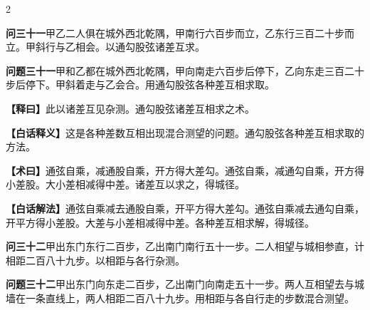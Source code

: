 \documentclass[11pt,a4paper]{article}
\newcommand{\WenQuestion}[1]{\textbf{\textcolor{classicalcolor}{#1}}}
\newcommand{\BaiQuestion}[1]{\textbf{\textcolor{moderncolor}{#1}}}
\newcommand{\WenExplain}{\textcolor{classicalcolor}{\textbf{【释曰】}}}
\newcommand{\BaiExplain}{\textcolor{moderncolor}{\textbf{【白话释义】}}}
\newcommand{\WenMethod}{\textcolor{classicalcolor}{\textbf{【术曰】}}}
\newcommand{\BaiMethod}{\textcolor{moderncolor}{\textbf{【白话解法】}}}
\begin{document}
\begin{paracol}{2}
\vspace{0.8em}

\switchcolumn*
\begin{tcolorbox}[colback=red!3,colframe=red!30!black,boxrule=0.3pt]
\WenQuestion{问三十一}\quad 甲乙二人俱在城外西北乾隅，甲南行六百步而立，乙东行三百二十步而立。甲斜行与乙相会。以通勾股弦诸差互求。
\end{tcolorbox}
\switchcolumn
\begin{tcolorbox}[colback=blue!3,colframe=blue!30!black,boxrule=0.3pt]
\BaiQuestion{问题三十一}\quad 甲和乙都在城外西北乾隅，甲向南走六百步后停下，乙向东走三百二十步后停下。甲斜着走与乙会合。用通勾股弦各种差互相求取。
\end{tcolorbox}

\switchcolumn*
\begin{tcolorbox}[colback=red!5,colframe=red!30!black,boxrule=0.3pt]
\WenExplain\quad 此以诸差互见杂测。通勾股弦诸差互相求之术。
\end{tcolorbox}
\switchcolumn
\begin{tcolorbox}[colback=blue!5,colframe=blue!30!black,boxrule=0.3pt]
\BaiExplain\quad 这是各种差数互相出现混合测望的问题。通勾股弦各种差互相求取的方法。
\end{tcolorbox}

\switchcolumn*
\begin{tcolorbox}[colback=red!5,colframe=red!40!black,boxrule=0.3pt]
\WenMethod\quad 通弦自乘，减通股自乘，开方得大差勾。通弦自乘，减通勾自乘，开方得小差股。大小差相减得中差。诸差互以求之，得城径。
\end{tcolorbox}
\switchcolumn
\begin{tcolorbox}[colback=blue!5,colframe=blue!40!black,boxrule=0.3pt]
\BaiMethod\quad 通弦自乘减去通股自乘，开平方得大差勾。通弦自乘减去通勾自乘，开平方得小差股。大差与小差相减得中差。各种差互相求解，得城径。
\end{tcolorbox}

\vspace{0.8em}

\switchcolumn*
\begin{tcolorbox}[colback=red!3,colframe=red!30!black,boxrule=0.3pt]
\WenQuestion{问三十二}\quad 甲出东门东行二百步，乙出南门南行五十一步。二人相望与城相参直，计相距二百八十九步。以相距与各行杂测。
\end{tcolorbox}
\switchcolumn
\begin{tcolorbox}[colback=blue!3,colframe=blue!30!black,boxrule=0.3pt]
\BaiQuestion{问题三十二}\quad 甲出东门向东走二百步，乙出南门向南走五十一步。两人互相望去与城墙在一条直线上，两人相距二百八十九步。用相距与各自行走的步数混合测望。
\end{tcolorbox}


\end{paracol}
\end{document}
